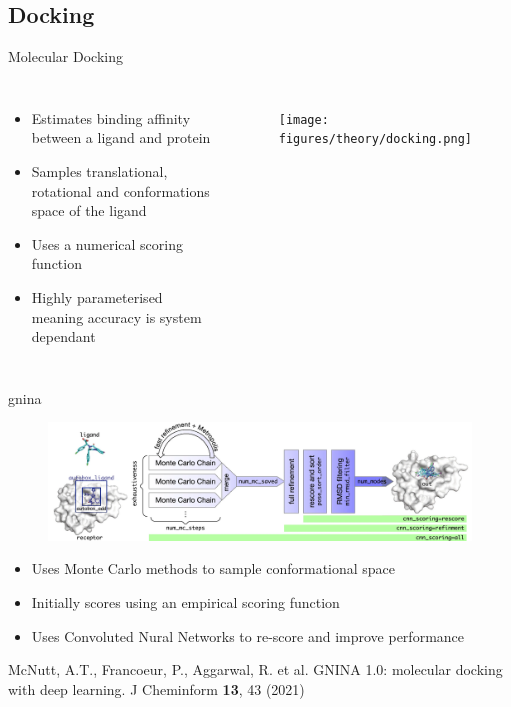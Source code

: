 \subsection{Docking}
\begin{frame}{Molecular Docking}
\begin{columns}
\begin{itemize}
	\item Estimates binding affinity between a ligand and protein
	\item Samples translational, rotational and conformations space of the ligand
	\item Uses a numerical scoring function	
	\item Highly parameterised meaning accuracy is system dependant
\end{itemize}
\begin{figure}
\texttt{[image: figures/theory/docking.png]}
\end{figure}
\end{columns}
\end{frame}

\begin{frame}{gnina}
\begin{figure}
\includegraphics[height=0.4\textheight]{figures/theory/gnina.png}
\end{figure}
\begin{itemize}
	\item Uses Monte Carlo methods to sample conformational space
	\item Initially scores using an empirical scoring function
	\item Uses Convoluted Nural Networks to re-score and improve performance
\end{itemize}
{\tiny
McNutt, A.T., Francoeur, P., Aggarwal, R. et al. GNINA 1.0: molecular docking with deep learning. J Cheminform \textbf{13}, 43 (2021)}
\end{frame}